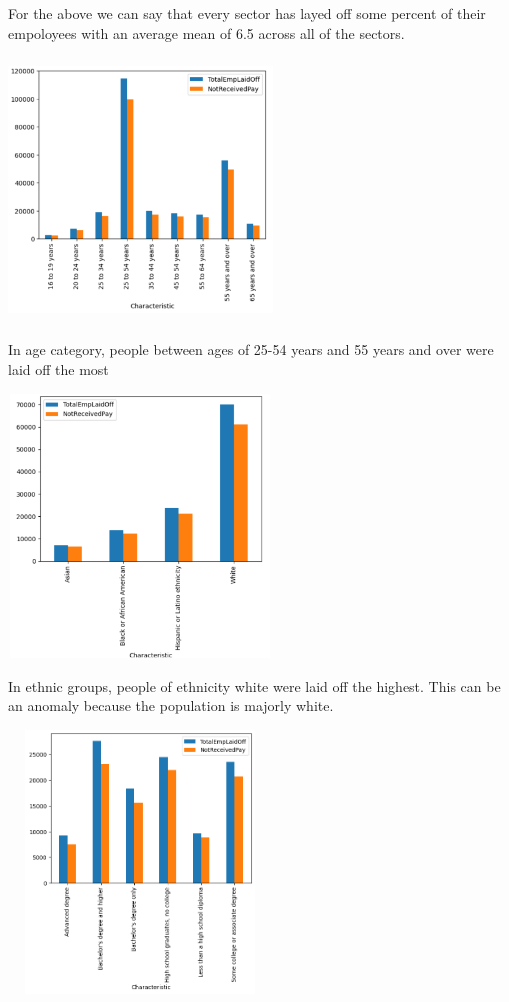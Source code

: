 \documentclass[fleqn,10pt]{SelfArx} %
\begin{document}
For the above we can say that every sector has layed off some percent of their empoloyees with an average mean of 6.5 across all of the sectors.


\includegraphics[width=7cm, height=7cm]{t3_bar_2.png}

In age category, people between ages of 25-54 years and 55 years and over were laid off the most

\includegraphics[width=7cm, height=7cm]{t3_bar_3.png}

In ethnic groups, people of ethnicity white were laid off the highest. This can be an anomaly because the population is majorly white.

\includegraphics[width=7cm, height=7cm]{t3_bar_5.png}
\end{document}
